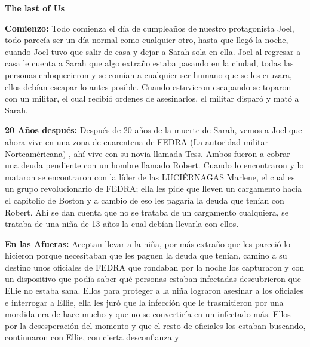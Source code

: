 \documentclass[•]{article}
\begin{document}
	\begin{center}
		\begin{huge}
			\textbf{The last of Us}
		\end{huge}
	\end{center}
	
	\begin{flushleft}
		\textbf{Comienzo:}
		Todo comienza el d\'ia de cumpleaños de nuestro protagonista Joel, todo parecía ser un día normal como cualquier otro, hasta que llegó la noche, cuando Joel tuvo que salir de casa y dejar a Sarah sola en ella. Joel al regresar a casa le cuenta a Sarah que algo extraño estaba pasando en la ciudad, todas las personas enloquecieron y se com\'ian a cualquier ser humano que se les cruzara, ellos debían escapar lo antes posible. Cuando estuvieron escapando se toparon con un militar, el cual recibió ordenes de asesinarlos, el militar dispar\'o y mat\'o a Sarah.
		
		\textbf{20 Años despu\'es: } Despu\'es de 20 años de la muerte de Sarah, vemos a Joel que ahora vive en una zona de cuarentena de FEDRA (La autoridad militar Norteam\'ericana) , ah\'i vive con su  novia llamada Tess.  Ambos fueron a cobrar una deuda pendiente con un hombre llamado Robert. Cuando lo encontraron y lo mataron se encontraron con la l\'ider de las LUCI\'ERNAGAS Marlene, el cual es un grupo revolucionario de FEDRA; ella les pide que lleven un cargamento hacia el capitolio de Boston y a cambio de eso les pagaría la deuda que tenían con Robert. Ah\'i se dan cuenta que no se trataba de un cargamento cualquiera, se trataba de una niña de 13 años la cual deb\'ian llevarla con ellos. 
		
		
	\textbf{En las Afueras: }Aceptan llevar a la niña, por m\'as extraño que les pareci\'o lo hicieron porque necesitaban que les paguen la deuda que ten\'ian, camino a su destino unos oficiales de FEDRA que rondaban por la noche los capturaron y con un dispositivo que pod\'ia saber qu\'e personas estaban infectadas descubrieron que Ellie no estaba sana. Ellos para proteger a la niña lograron asesinar a los oficiales e interrogar a Ellie, ella les jur\'o que la infecci\'on que le trasmitieron por una mordida era de hace mucho y que no se convertir\'ia en un infectado m\'as. Ellos por la desesperaci\'on del momento y que el resto de oficiales los estaban buscando, continuaron con Ellie, con cierta desconfianza y 
		
	\end{flushleft}
\end{document}
